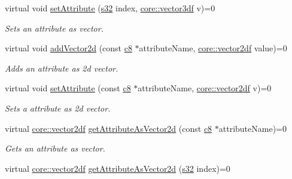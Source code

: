 \begin{DoxyCompactItemize}
virtual void \hyperlink{classirr_1_1io_1_1IAttributes_ac042bda6760e9adcfd967b0046d55d20}{set\+Attribute} (\hyperlink{namespaceirr_ac66849b7a6ed16e30ebede579f9b47c6}{s32} index, \hyperlink{namespaceirr_1_1core_ae6e2b2a6c552833ebbd5b7463d03586b}{core\+::vector3df} v)=0
\begin{DoxyCompactList}\small\item\em Sets an attribute as vector. \end{DoxyCompactList}\item 
\mbox{\label{classirr_1_1io_1_1IAttributes_a515026d0bfa5c984cb2b0799b9468803}} 
virtual void \hyperlink{classirr_1_1io_1_1IAttributes_a515026d0bfa5c984cb2b0799b9468803}{add\+Vector2d} (const \hyperlink{namespaceirr_a9395eaea339bcb546b319e9c96bf7410}{c8} $\ast$attribute\+Name, \hyperlink{namespaceirr_1_1core_a116f90bd31515724b6235014ee2b74d5}{core\+::vector2df} value)=0
\begin{DoxyCompactList}\small\item\em Adds an attribute as 2d vector. \end{DoxyCompactList}\item 
\mbox{\label{classirr_1_1io_1_1IAttributes_a51c9f7fbc0d26fd4123a5cf3d6059f4d}} 
virtual void \hyperlink{classirr_1_1io_1_1IAttributes_a51c9f7fbc0d26fd4123a5cf3d6059f4d}{set\+Attribute} (const \hyperlink{namespaceirr_a9395eaea339bcb546b319e9c96bf7410}{c8} $\ast$attribute\+Name, \hyperlink{namespaceirr_1_1core_a116f90bd31515724b6235014ee2b74d5}{core\+::vector2df} v)=0
\begin{DoxyCompactList}\small\item\em Sets a attribute as 2d vector. \end{DoxyCompactList}\item 
virtual \hyperlink{namespaceirr_1_1core_a116f90bd31515724b6235014ee2b74d5}{core\+::vector2df} \hyperlink{classirr_1_1io_1_1IAttributes_a047461734c2eb9e3f1b68a4278a0d24b}{get\+Attribute\+As\+Vector2d} (const \hyperlink{namespaceirr_a9395eaea339bcb546b319e9c96bf7410}{c8} $\ast$attribute\+Name)=0
\begin{DoxyCompactList}\small\item\em Gets an attribute as vector. \end{DoxyCompactList}\item 
virtual \hyperlink{namespaceirr_1_1core_a116f90bd31515724b6235014ee2b74d5}{core\+::vector2df} \hyperlink{classirr_1_1io_1_1IAttributes_a81fb2a12345e49b12cd6cf05968544f5}{get\+Attribute\+As\+Vector2d} (\hyperlink{namespaceirr_ac66849b7a6ed16e30ebede579f9b47c6}{s32} index)=0

\end{DoxyCompactItemize}
